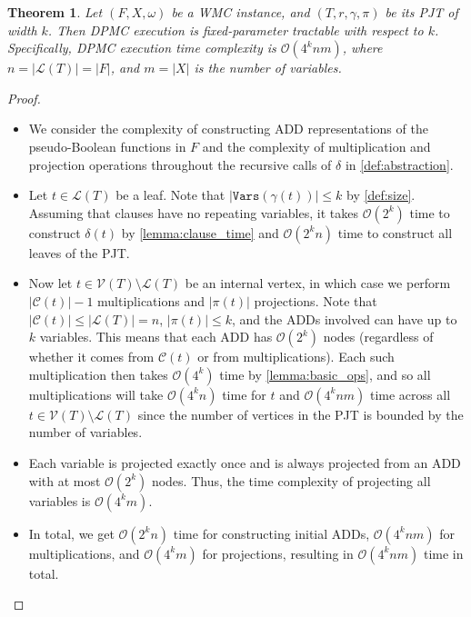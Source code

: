 \documentclass{article}
\newtheorem{theorem}{Theorem}
\theoremstyle{definition}
\theoremstyle{remark}
\begin{document}
\begin{theorem}
  Let $(F, X, \omega)$ be a WMC instance, and $(T, r, \gamma, \pi)$ be its PJT
  of width $k$. Then \textsc{DPMC} execution is fixed-parameter tractable with
  respect to $k$. Specifically, \textsc{DPMC} execution time complexity is
  $\mathcal{O}(4^knm)$, where $n = |\mathcal{L}(T)| = |F|$, and $m = |X|$ is the
  number of variables.
\end{theorem}
\begin{proof}
  \begin{itemize}
  \item We consider the complexity of constructing ADD representations of the
    pseudo-Boolean functions in $F$ and the complexity of multiplication and
    projection operations throughout the recursive calls of $\delta$ in
    \cref{def:abstraction}.
  \item Let $t \in \mathcal{L}(T)$ be a leaf. Note that
    $|\mathtt{Vars}(\gamma(t))| \le k$ by \cref{def:size}. Assuming that clauses
    have no repeating variables, it takes $\mathcal{O}(2^k)$ time to construct
    $\delta(t)$ by \cref{lemma:clause_time} and $\mathcal{O}(2^kn)$ time to
    construct all leaves of the PJT.
  \item Now let $t \in \mathcal{V}(T) \setminus \mathcal{L}(T)$ be an internal
    vertex, in which case we perform $|\mathcal{C}(t)|-1$ multiplications and
    $|\pi(t)|$ projections. Note that $|\mathcal{C}(t)| \le |\mathcal{L}(T)| =
    n$, $|\pi(t)| \le k$, and the ADDs involved can have up to $k$ variables.
    This means that each ADD has $\mathcal{O}(2^k)$ nodes (regardless of whether
    it comes from $\mathcal{C}(t)$ or from multiplications). Each such
    multiplication then takes $\mathcal{O}(4^k)$ time by \cref{lemma:basic_ops},
    and so all multiplications will take $\mathcal{O}(4^kn)$ time for $t$ and
    $\mathcal{O}(4^knm)$ time across all $t \in \mathcal{V}(T) \setminus
    \mathcal{L}(T)$ since the number of vertices in the PJT is bounded by the
    number of variables.
  \item Each variable is projected exactly once and is always projected from
    an ADD with at most $\mathcal{O}(2^k)$ nodes. Thus, the time complexity of
    projecting all variables is $\mathcal{O}(4^km)$.
  \item In total, we get $\mathcal{O}(2^kn)$ time for constructing initial ADDs,
    $\mathcal{O}(4^knm)$ for multiplications, and $\mathcal{O}(4^km)$ for
    projections, resulting in $\mathcal{O}(4^knm)$ time in total.
  \end{itemize}
\end{proof}



\end{document}
